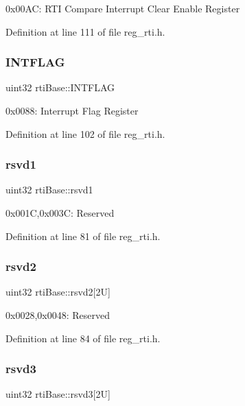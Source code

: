 0x00\+AC\+: R\+TI Compare Interrupt Clear Enable Register 

Definition at line 111 of file reg\+\_\+rti.\+h.

\mbox{\label{structrtiBase_a0c4ca8a285b9e98d39e952b9f4ec4541}} 
\subsubsection{\texorpdfstring{I\+N\+T\+F\+L\+AG}{INTFLAG}}
{\footnotesize\ttfamily uint32 rti\+Base\+::\+I\+N\+T\+F\+L\+AG}

0x0088\+: Interrupt Flag Register 

Definition at line 102 of file reg\+\_\+rti.\+h.

\mbox{\label{structrtiBase_ab2b29a6ee442a2e9783f2de0e7335a9a}} 
\subsubsection{\texorpdfstring{rsvd1}{rsvd1}}
{\footnotesize\ttfamily uint32 rti\+Base\+::rsvd1}

0x001C,0x003C\+: Reserved 

Definition at line 81 of file reg\+\_\+rti.\+h.

\mbox{\label{structrtiBase_ade068bf96a04ddbe34663fe18d1692e9}} 
\subsubsection{\texorpdfstring{rsvd2}{rsvd2}}
{\footnotesize\ttfamily uint32 rti\+Base\+::rsvd2\mbox{[}2\+U\mbox{]}}

0x0028,0x0048\+: Reserved 

Definition at line 84 of file reg\+\_\+rti.\+h.

\mbox{\label{structrtiBase_aefc905943bdc1f51c6c9a7ffda57d527}} 
\subsubsection{\texorpdfstring{rsvd3}{rsvd3}}
{\footnotesize\ttfamily uint32 rti\+Base\+::rsvd3\mbox{[}2\+U\mbox{]}}

